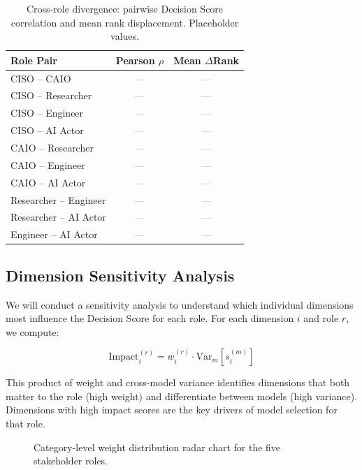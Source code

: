 \documentclass[10pt,twocolumn]{article}
\newcommand{\placeholder}{\textcolor{gray}{\textsf{---}}}
\begin{document}
\begin{table}[t]
\centering
\caption{Cross-role divergence: pairwise Decision Score correlation and mean rank displacement. Placeholder values.}
\label{tab:divergence}
\small
\begin{tabular}{@{}l c c@{}}
\toprule
\textbf{Role Pair} & \textbf{Pearson $\rho$} & \textbf{Mean $\Delta$Rank} \\
\midrule
CISO -- CAIO             & \placeholder & \placeholder \\
CISO -- Researcher       & \placeholder & \placeholder \\
CISO -- Engineer         & \placeholder & \placeholder \\
CISO -- AI Actor         & \placeholder & \placeholder \\
CAIO -- Researcher       & \placeholder & \placeholder \\
CAIO -- Engineer         & \placeholder & \placeholder \\
CAIO -- AI Actor         & \placeholder & \placeholder \\
Researcher -- Engineer   & \placeholder & \placeholder \\
Researcher -- AI Actor   & \placeholder & \placeholder \\
Engineer -- AI Actor     & \placeholder & \placeholder \\
\bottomrule
\end{tabular}
\end{table}

\subsection{Dimension Sensitivity Analysis}
\label{sec:sensitivity}

We will conduct a sensitivity analysis to understand which individual dimensions most influence the Decision Score for each role. For each dimension $i$ and role $r$, we compute:

\begin{equation}
\text{Impact}_i^{(r)} = w_i^{(r)} \cdot \text{Var}_{m}[s_i^{(m)}]
\label{eq:impact}
\end{equation}

This product of weight and cross-model variance identifies dimensions that both matter to the role (high weight) and differentiate between models (high variance). Dimensions with high impact scores are the key drivers of model selection for that role.

\begin{figure}[t]
\centering
{}
\caption{Category-level weight distribution radar chart for the five stakeholder roles.}
\label{fig:radar}
\end{figure}
\end{document}
